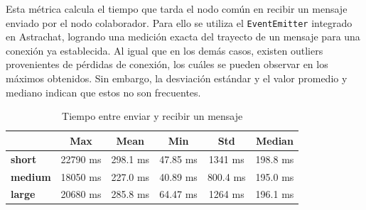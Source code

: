 Esta métrica calcula el tiempo que tarda el nodo común en recibir un mensaje enviado por el nodo colaborador. Para ello se utiliza el \texttt{EventEmitter} integrado en Astrachat, logrando una medición exacta del trayecto de un mensaje para una conexión ya establecida. Al igual que en los demás casos, existen outliers provenientes de pérdidas de conexión, los cuáles se pueden observar en los máximos obtenidos. Sin embargo, la desviación estándar y el valor promedio y mediano indican que estos no son frecuentes.

\setlength\tabcolsep{10pt}
\begin{table}[!htbp]
    \centering
    \begin{tabular}{|l|c|c|c|c|c|}
        \hline
        & \textbf{Max} & \textbf{Mean} & \textbf{Min} & \textbf{Std} & \textbf{Median} \\ \hline
        \textbf{short} & 22790 ms & 298.1 ms & 47.85 ms & 1341 ms & 198.8 ms \\ \hline
        \textbf{medium} & 18050 ms & 227.0 ms & 40.89 ms & 800.4 ms & 195.0 ms \\ \hline
        \textbf{large} & 20680 ms & 285.8 ms & 64.47 ms & 1264 ms & 196.1 ms \\ \hline
    \end{tabular}
    \caption{Tiempo entre enviar y recibir un mensaje}
\end{table}  